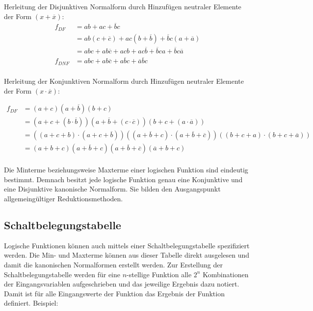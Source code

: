 Herleitung der Disjunktiven Normalform durch Hinzufügen neutraler Elemente der Form $(x + \overline{x})$:
\begin{align*}
	f_{\textit{DF}} &= ab + ac + \overline{b}c    \\
	                &= ab(c + \overline{c})
	                 + ac(b + \overline{b})
	                 + \overline{b}c(a + \overline{a})    \\
	                &= abc + ab\overline{c}
	                 + acb + ac\overline{b}
	                 + \overline{b}ca + \overline{b}c\overline{a}    \\
	f_{\textit{DNF}} &= abc + ab\overline{c} + a\overline{b}c
	                  + \overline{a}\overline{b}c    \\
\end{align*}

Herleitung der Konjunktiven Normalform durch Hinzufügen neutraler Elemente der Form $(x \cdot \overline{x})$:

\begin{align*}
	f_{\textit{DF}} &= (a + c) (a + \overline{b}) (b + c) \\
					&= (a + c + (b \cdot \overline{b})) 
						(a + \overline{b} + (c \cdot \overline{c})) 
						(b + c + (a \cdot \overline{a})) \\
					&= ((a + c + b) \cdot (a + c + \overline{b})) 
						((a + \overline{b} + c) \cdot 
						(a + \overline{b} + \overline{c}))
						((b + c + a) \cdot (b + c + \overline{a})) \\
					&= (a + b + c) (a + \overline{b} + c)
						(a + \overline{b} + \overline{c})
						(\overline{a} + b + c) \\
\end{align*}

Die Minterme beziehungsweise Maxterme einer logischen Funktion sind eindeutig bestimmt. Demnach besitzt jede logische Funktion genau eine Konjunktive und eine Disjunktive kanonische Normalform. Sie bilden den Ausgangspunkt allgemeingültiger Reduktionsmethoden.

\subsection{Schaltbelegungstabelle}
Logische Funktionen können auch mittels einer Schaltbelegungstabelle spezifiziert werden. Die Min- und Maxterme können aus dieser Tabelle direkt ausgelesen und damit die kanonischen Normalformen erstellt werden. Zur Erstellung der Schaltbelegungstabelle werden für eine $n$-stellige Funktion alle $2^n$ Kombinationen der Eingangsvariablen aufgeschrieben und das jeweilige Ergebnis dazu notiert. Damit ist für alle Eingangswerte der Funktion das Ergebnis der Funktion definiert. Beispiel:

